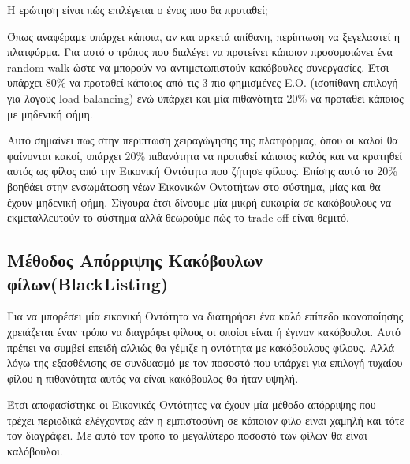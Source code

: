 Η ερώτηση είναι πώς επιλέγεται ο ένας που θα προταθεί;

Όπως αναφέραμε υπάρχει κάποια, αν και αρκετά απίθανη, περίπτωση να ξεγελαστεί η πλατφόρμα. Για αυτό ο τρόπος που διαλέγει να προτείνει κάποιον προσομοιώνει ένα random walk ώστε να μπορούν να αντιμετωπιστούν κακόβουλες συνεργασίες. Έτσι υπάρχει 80\% να προταθεί κάποιος από τις 3 πιο φημισμένες Ε.Ο. (ισοπίθανη επιλογή για λογους load balancing) ενώ υπάρχει και μία πιθανότητα 20\% να προταθεί κάποιος με μηδενική φήμη.

Αυτό σημαίνει πως στην περίπτωση χειραγώγησης της πλατφόρμας, όπου οι καλοί θα φαίνονται κακοί, υπάρχει 20\% πιθανότητα να προταθεί κάποιος καλός και να  κρατηθεί αυτός ως φίλος από την Εικονική Οντότητα που ζήτησε φίλους. Επίσης αυτό το 20\% βοηθάει στην ενσωμάτωση νέων Εικονικών Οντοτήτων στο σύστημα, μίας και θα έχουν μηδενική φήμη.
Σίγουρα έτσι δίνουμε μία μικρή ευκαιρία σε κακόβουλους να εκμεταλλευτούν το σύστημα αλλά θεωρούμε πώς το trade-off είναι θεμιτό.


\subsection{Μέθοδος Απόρριψης Κακόβουλων φίλων(BlackListing)}\label{sec:blacklisting}

Για να μπορέσει μία εικονική Οντότητα να διατηρήσει ένα καλό επίπεδο ικανοποίησης χρειάζεται έναν τρόπο να διαγράφει φίλους οι οποίοι είναι ή έγιναν κακόβουλοι. Αυτό πρέπει να συμβεί επειδή αλλιώς θα γέμιζε η οντότητα με κακόβουλους φίλους. Αλλά λόγω της εξασθένισης σε συνδυασμό με τον ποσοστό που υπάρχει για επιλογή τυχαίου φίλου η πιθανότητα αυτός να είναι κακόβουλος θα ήταν υψηλή.

Έτσι αποφασίστηκε οι Εικονικές Οντότητες να έχουν μία μέθοδο απόρριψης που τρέχει περιοδικά ελέγχοντας εάν η εμπιστοσύνη σε κάποιον φίλο είναι χαμηλή και τότε τον διαγράφει. Με αυτό τον τρόπο το μεγαλύτερο ποσοστό των φίλων θα είναι καλόβουλοι.



